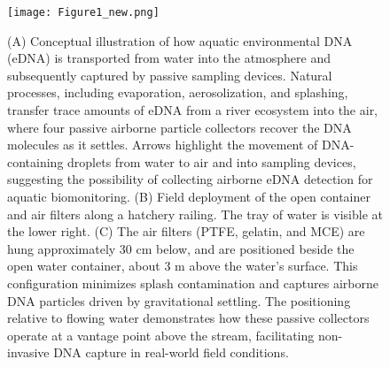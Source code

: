 \documentclass{article}
\begin{document}

\begin{figure}[tbhp] 
\centering
\texttt{[image: Figure1\_new.png]}  
\caption{(A) Conceptual illustration of how aquatic environmental DNA (eDNA) is transported from water into the atmosphere and subsequently captured by passive sampling devices. Natural processes, including evaporation, aerosolization, and splashing, transfer trace amounts of eDNA from a river ecosystem into the air, where four passive airborne particle collectors recover the DNA molecules as it settles. Arrows highlight the movement of DNA-containing droplets from water to air and into sampling devices, suggesting the possibility of collecting airborne eDNA detection for aquatic biomonitoring. (B) Field deployment of the open container and air filters along a hatchery railing. The tray of water is visible at the lower right. (C) The air filters (PTFE, gelatin, and MCE) are hung approximately 30 cm below, and are positioned beside the open water container, about 3 m above the water’s surface. This configuration minimizes splash contamination and captures airborne DNA particles driven by gravitational settling. The positioning relative to flowing water demonstrates how these passive collectors operate at a vantage point above the stream, facilitating non-invasive DNA capture in real-world field conditions.}
\label{fig:AI_physical_model}
\end{figure}
\end{document}
